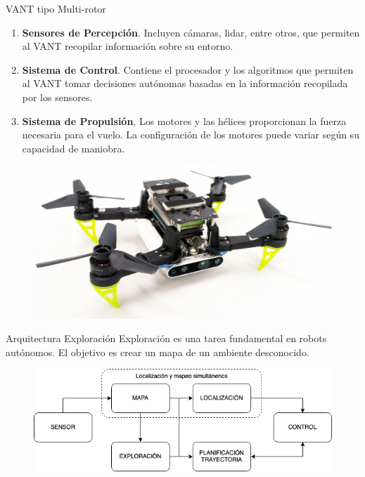 \documentclass[final]{beamer}
\newlength{\colwidth}
\begin{document}
\begin{frame}[t]
\begin{columns}[t]
\begin{column}{\colwidth}
  
  \begin{block}{\color{teal}VANT tipo Multi-rotor}
    \begin{enumerate}
      \item \textbf{Sensores de Percepción}. Incluyen cámaras, lidar, entre otros, que permiten al VANT recopilar información sobre su entorno.
      \item \textbf{Sistema de Control}. Contiene el procesador y los algoritmos que permiten al VANT tomar decisiones autónomas basadas en la información recopilada por los sensores.
      \item \textbf{Sistema de Propulsión}, Los motores y las hélices proporcionan la fuerza necesaria para el vuelo. La configuración de los motores puede variar según su capacidad de maniobra.
    \end{enumerate}

    \begin{figure}[t]
      \includegraphics[width=30cm]{images/uav_planning_drone.jpg}
      \centering
    \end{figure}
    
  \end{block}
  
  \begin{block}{\color{teal}Arquitectura Exploración}
    Exploración es una tarea fundamental en robots autónomos. El objetivo es crear un mapa de un ambiente desconocido.
    \begin{figure}[t]
      \centering
      \includegraphics[width=32cm]{images/exploracion.png}
    \end{figure}
    

\end{block}
\end{column}
\end{columns}
\end{frame}
\end{document}
